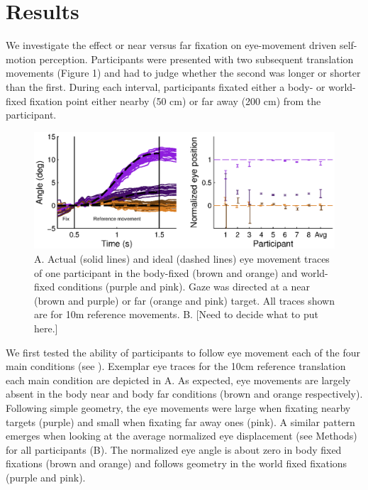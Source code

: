 \section{Results}

We investigate the effect or near versus far fixation on eye-movement driven self-motion perception. Participants were presented with two subsequent translation movements (Figure 1) and had to judge whether the second was longer or shorter than the first. During each interval, participants fixated either a body- or world-fixed fixation point either nearby (50 cm) or far away (200 cm) from the participant.


\begin{figure}
    \includegraphics[width=1.0\textwidth]{src/paper4/paper4_figure2.eps}

    \caption{A. Actual (solid lines) and ideal (dashed lines) eye movement traces of one participant in the body-fixed (brown and orange) and world-fixed conditions (purple and pink). Gaze was directed at a near (brown and purple) or far (orange and pink) target. All traces shown are for 10m reference movements. B. [Need to decide what to put here.]}
    \label{p4:fig2}
\end{figure}

We first tested the ability of participants to follow eye movement each of the four main conditions (see ). Exemplar eye traces for the 10cm reference translation each main condition are depicted in A. As expected, eye movements are largely absent in the body near and body far conditions (brown and orange respectively). Following simple geometry, the eye movements were large when fixating nearby targets (purple) and small when fixating far away ones (pink). A similar pattern emerges when looking at the average normalized eye displacement (see Methods) for all participants (B).  The normalized eye angle is about zero in body fixed fixations (brown and orange) and follows geometry in the world fixed fixations (purple and pink).  

